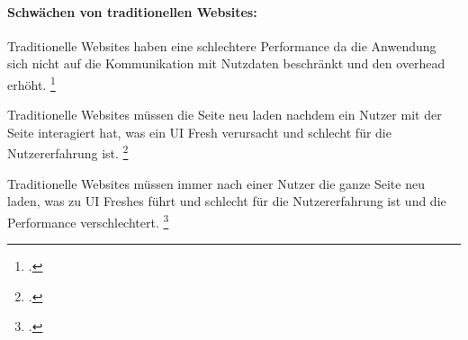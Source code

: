 \paragraph*{Schwächen von traditionellen Websites:}

Traditionelle Websites haben eine schlechtere Performance da die Anwendung sich nicht auf die Kommunikation mit Nutzdaten beschränkt und den overhead erhöht.
\footcite[Vgl. ][Seite 8]{Smith2022}

Traditionelle Websites müssen die Seite neu laden nachdem ein Nutzer mit der Seite interagiert hat, was ein \ac{UI} Fresh verursacht und schlecht für die Nutzererfahrung ist.
\footcite[Vgl. ][Seite 3]{Smith2022}

Traditionelle Websites müssen immer nach einer Nutzer die ganze Seite neu laden, was zu \ac{UI} Freshes führt und schlecht für die Nutzererfahrung ist und die Performance verschlechtert.
\footcite[Vgl. ][Seite 8]{Smith2022}

